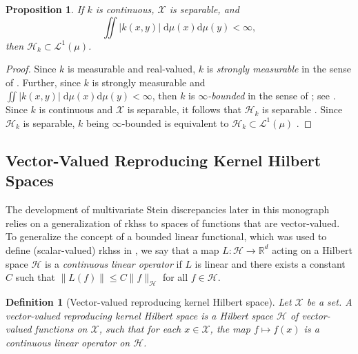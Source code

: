 \documentclass[12pt,paper=letter]{scrreprt}
\newtheorem{proposition}{Proposition}[chapter]
\newtheorem{definition}{Definition}[chapter]
\begin{document}
\begin{proposition} \label{prop: double integral condition}
If $k$ is continuous, $\mathcal{X}$ is separable, and 
$$
\iint |k(x,y)| \; \mathrm{d}\mu(x) \mathrm{d}\mu(y) < \infty, 
$$
then $\mathcal{H}_k \subset \mathcal{L}^1(\mu)$.
\end{proposition}
\begin{proof}
Since $k$ is measurable and real-valued, $k$ is \emph{strongly measurable} in the sense of \citet[][Section 3.1]{carmeli2006vector}.
Further, since $k$ is strongly measurable and $\iint |k(x,y)| \; \mathrm{d}\mu(x) \mathrm{d}\mu(y) < \infty$, then $k$ is \emph{$\infty$-bounded} in the sense of \citet[][Definition 4.1]{carmeli2006vector}; see \citet[][Corollary 4.3]{carmeli2006vector}.
Since $k$ is continuous and $\mathcal{X}$ is separable, it follows that $\mathcal{H}_k$ is separable \citep[][Corollary 5.2]{carmeli2006vector}.
Since $\mathcal{H}_k$ is separable, $k$ being $\infty$-bounded is equivalent to $\mathcal{H}_k \subset \mathcal{L}^1(\mu)$ \citep[][Proposition 4.4]{carmeli2006vector}.
\end{proof}



\subsection{Vector-Valued Reproducing Kernel Hilbert Spaces}
\label{subsec: vvrkhs}

The development of multivariate Stein discrepancies later in this monograph relies on a generalization of \acp{rkhs} to spaces of functions that are vector-valued.
To generalize the concept of a bounded linear functional, which was used to define (scalar-valued) \acp{rkhs} in , we say that a map $L : \mathcal{H} \rightarrow \mathbb{R}^d$ acting on a Hilbert space $\mathcal{H}$ is a \emph{continuous linear operator} if $L$ is linear and there exists a constant $C$ such that $\|L(f)\| \leq C \|f\|_{\mathcal{H}}$ for all $f \in \mathcal{H}$.

\begin{definition}[Vector-valued reproducing kernel Hilbert space] \label{def: vvrkhs}
Let $\mathcal{X}$ be a set.
A \emph{vector-valued reproducing kernel Hilbert space} is a Hilbert space $\mathcal{H}$ of vector-valued functions on $\mathcal{X}$, such that for each $x \in \mathcal{X}$, the map $f \mapsto f(x)$ is a continuous linear operator on $\mathcal{H}$.
\end{definition}
\end{document}
